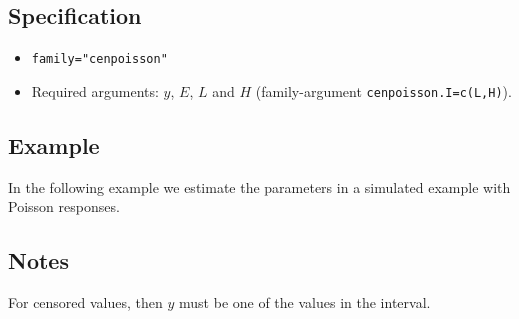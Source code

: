 \documentclass[a4paper,11pt]{article}
\begin{document}
\subsection*{Specification}

\begin{itemize}
\item \texttt{family="cenpoisson"}
\item Required arguments: $y$, $E$, $L$ and $H$ (family-argument
    \texttt{cenpoisson.I=c(L,H)}).
\end{itemize}

\subsection*{Example}

In the following example we estimate the parameters in a simulated
example with Poisson responses.
{\small

}

\subsection*{Notes}

For censored values, then $y$ must be one of the values in the
interval.
\end{document}
